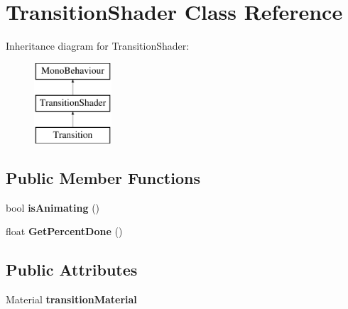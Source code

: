 \hypertarget{class_transition_shader}{\section{Transition\-Shader Class Reference}
\label{class_transition_shader}
}
Inheritance diagram for Transition\-Shader\-:\begin{figure}[H]
\begin{center}
\leavevmode
\includegraphics[height=3.000000cm]{class_transition_shader}
\end{center}
\end{figure}
\subsection*{Public Member Functions}
\begin{DoxyCompactItemize}
\item 
\hypertarget{class_transition_shader_ae8dedd089403a231910b379373df54c1}{bool {\bfseries is\-Animating} ()}\label{class_transition_shader_ae8dedd089403a231910b379373df54c1}

\item 
\hypertarget{class_transition_shader_a8cbeca073599504cadd53be59927442c}{float {\bfseries Get\-Percent\-Done} ()}\label{class_transition_shader_a8cbeca073599504cadd53be59927442c}

\end{DoxyCompactItemize}
\subsection*{Public Attributes}
\begin{DoxyCompactItemize}
\item 
\hypertarget{class_transition_shader_a14516825ffc31067685fd7e998de92c5}{Material {\bfseries transition\-Material}}\label{class_transition_shader_a14516825ffc31067685fd7e998de92c5}

\end{DoxyCompactItemize}
